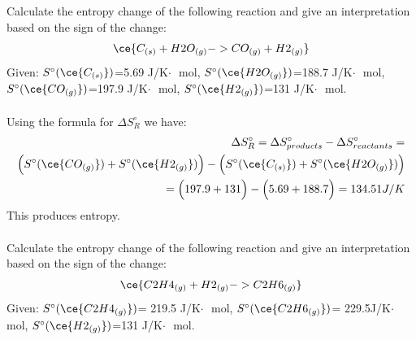 \documentclass[main.tex]{subfiles}
\begin{document}
\begin{description}
\begin{example} %
Calculate the entropy change of the following reaction and give an interpretation based on the sign of the change:
 \begin{equation*} \ce{C_{(s)} + H2O_{(g)} ->  CO_{(g)} + H2_{(g)} } \end{equation*}
Given: $S^{\circ}(\ce{C_{(s)}})$=5.69 J/K$\cdot \text{ }$mol, $S^{\circ}(\ce{H2O_{(g)}})$=188.7 J/K$\cdot \text{ }$mol, $S^{\circ}(\ce{CO_{(g)}})$=197.9 J/K$\cdot \text{ }$mol, $S^{\circ}(\ce{H2_{(g)}})$=131 J/K$\cdot \text{ }$mol.
\\
\\
Using the formula for $\Delta S^{\circ}_R$ we have:
\begin{equation*}\begin{split}
  \Delta S^{\circ}_R= \Delta S^{\circ}_{products}-\Delta S^{\circ}_{reactants}=\\ \Big(S^{\circ}(\ce{CO_{(g)}})   + S^{\circ}(\ce{H2_{(g)}}) \Big)-\Big(S^{\circ}(\ce{C_{(s)}})+ S^{\circ}(\ce{H2O_{(g)}}) \Big)      \\
  =     \Big(197.9   + 131\Big)-\Big(5.69 + 188.7 \Big)= 134.51J/K
\end{split}\end{equation*}
This produces entropy.\\
\faDiamond\ \\
Calculate the entropy change of the following reaction and give an interpretation based on the sign of the change:
 \begin{equation*} \ce{C2H4_{(g)}  + H2_{(g)}  -> C2H6_{(g)} 	 } \end{equation*}
Given: $S^{\circ}(\ce{C2H4_{(g)}})$= 219.5 J/K$\cdot \text{ }$mol, $S^{\circ}(\ce{C2H6_{(g)}})$= 229.5J/K$\cdot \text{ }$mol, $S^{\circ}(\ce{H2_{(g)}})$=131 J/K$\cdot \text{ }$mol.
 \\
\end{example}%


\end{description}
\end{document}
